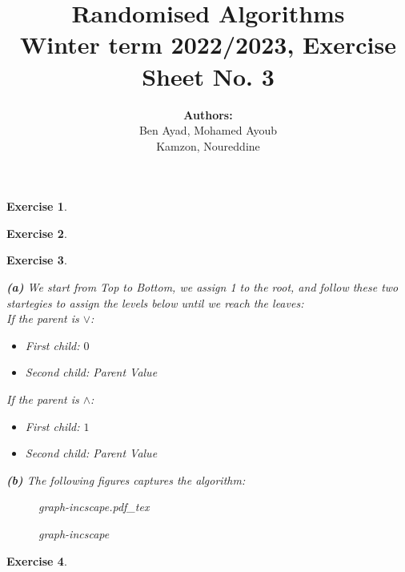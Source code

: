 \documentclass{article}
\title{Randomised Algorithms \\
Winter term 2022/2023, Exercise Sheet No. 3}
\author{
    \textbf{Authors:} \\
    Ben Ayad, Mohamed Ayoub \\
    Kamzon, Noureddine
}
\newcommand{\incfig}[1]{%
    \def\svgwidth{\columnwidth}
    {#1.pdf_tex}
}
\newtheorem{exo}{Exercise}
\begin{document}
\maketitle


\begin{exo}{\ \\}

\end{exo}


\begin{exo}{\ \\}

\end{exo}


\newpage
\begin{exo}{\ \\}

\textbf{(a)}
We start from Top to Bottom, we assign 1 to the root, and follow these two startegies  to assign the levels below until we reach the leaves:\\

If the parent is $\lor$:
\begin{itemize}
    \item First child: $0$
    \item Second child: Parent Value
\end{itemize}

If the parent is $\land$:
\begin{itemize}
    \item First child: $1$
    \item Second child: Parent Value
\end{itemize}

\textbf{(b)} The following figures captures the algorithm:
 
\begin{figure}[ht]
    \centering
    \incfig{graph-incscape}
    \caption{graph-incscape}
    \label{fig:graph-incscape}
\end{figure}


\end{exo}

\begin{exo}{\ \\}

\end{exo}
\end{document}
